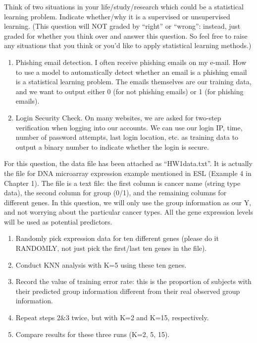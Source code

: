 \documentclass[14pt]{elegantbook}
\begin{document}
\begin{exercise*}
    Think of two situations in your life/study/research which could be a statistical learning  problem. Indicate whether/why it is a supervised or unsupervised learning. (This question will NOT graded by “right” or “wrong”: instead, just graded for whether you think over and answer this question. So feel free to raise any situations that you think or you'd like to apply statistical learning methods.) 
\end{exercise*}

\begin{solution}
    \begin{enumerate}
        \item Phishing email detection. I often receive phishing emails on my e-mail. How to use a model to automatically detect whether an email is a phishing email is a statistical learning problem. The emails themselves are our training data, and we want to output either 0 (for not phishing emails) or 1 (for phishing emails). 
        \item Login Security Check. On many websites, we are asked for two-step verification when logging into our accounts. We can use our login IP, time, number of password attempts, last login location, etc. as training data to output a binary number to indicate whether the login is secure. 
    \end{enumerate}
\end{solution}

\begin{exercise*}
    For this question, the data file has been attached as “HW1data.txt”. It is actually the file for DNA microarray expression example mentioned in ESL (Example 4 in Chapter 1). The file is a text file: the first column is cancer name (string type data), the second column for group (0/1), and the remaining columns for different genes. In this question, we will only use the group information as our Y, and not worrying about the particular cancer types. All the gene expression levels will be used as potential predictors. 
    \begin{enumerate}
        \item Randomly pick expression data for ten different genes (please do it RANDOMLY, not just pick the first/last ten genes in the file). 
        \item Conduct KNN analysis with K=5 using these ten genes. 
        \item Record the value of training error rate: this is the proportion of subjects with their predicted group information different from their real observed group information. 
        \item Repeat steps $2\&3$ twice, but with K=2 and K=15, respectively.
        \item Compare results for these three runs (K=2, 5, 15).
    \end{enumerate}
\end{exercise*}
\end{document}
